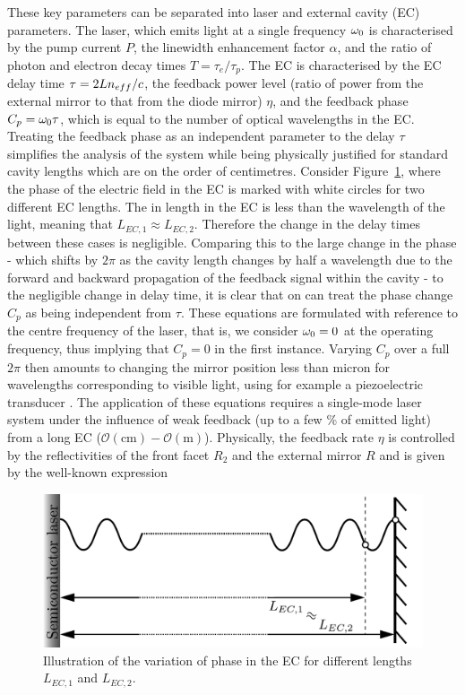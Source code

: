 %
These key parameters can be separated into laser and external cavity (EC) parameters. The laser, which emits light at a single frequency $\omega_0$ is characterised by the pump current $P$, the linewidth enhancement factor $\alpha$, and the ratio of photon and electron decay times $T = \tau_e/\tau_p$. The EC is characterised by the EC delay time $\tau = 2Ln_{eff}/c$, the feedback power level (ratio of power from the external mirror to that from the diode mirror) $\eta$, and the feedback phase $C_p = \omega_0 \tau$, which is equal to the number of optical wavelengths in the EC. Treating the feedback phase as an independent parameter to the delay $\tau$ simplifies the analysis of the system while being physically justified for standard cavity lengths which are on the order of centimetres. Consider Figure~\ref{fig:Cp}, where the phase of the electric field in the EC is marked with white circles for two different EC lengths. The in length in the EC is less than the wavelength of the light, meaning that $L_{EC,1}\approx L_{EC,2}$. Therefore the change in the delay times between these cases is negligible. Comparing this to the large change in the phase - which shifts by $2\pi$ as the cavity length changes by half a wavelength due to the forward and backward propagation of the feedback signal within the cavity - to the negligible change in delay time, it is clear that on can treat the phase change $C_p$ as being independent from $\tau$. These equations are formulated with reference to the centre frequency of the laser, that is, we consider $\omega_0 = 0$ at the operating frequency, thus implying that $C_p=0$ in the first instance. Varying $C_p$ over a full $2\pi$ then amounts to changing the mirror position less than micron for wavelengths corresponding to visible light, using for example a piezoelectric transducer \cite{heil2003delay}. The application of these equations requires a single-mode laser system under the influence of weak feedback (up to a few \% of emitted light) from a long EC ($\mathcal{O}(\text{cm}) - \mathcal{O}(\text{m})$). Physically, the feedback rate $\eta$ is controlled by the reflectivities of the front facet $R_2$ and the external mirror $R$ and is given by the well-known expression 
%
\begin{figure}[!t]
    \centering
    
    \includegraphics[width=0.65\linewidth]{Images/Introduction/Cp diagram.pdf}
    
    \caption{Illustration of the variation of phase in the EC for different lengths $L_{EC,1}$ and $L_{EC,2}$.}
    
    \label{fig:Cp}
\end{figure}
